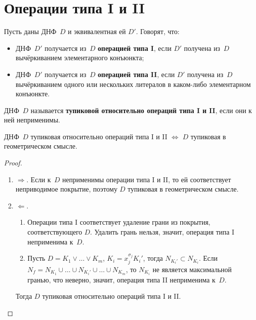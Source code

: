 \section{Операции типа I и II}
Пусть даны ДНФ~$D$ и эквивалентная ей $D'$.
Говорят, что:
\begin{itemize}
	\item ДНФ~$D'$ получается из~$D$ \textbf{операцией типа I}, если $D'$ получена из~$D$ вычёркиванием элементарного конъюнкта;
	\item ДНФ~$D'$ получается из~$D$ \textbf{операцией типа II}, если $D'$ получена из~$D$ вычёркиванием одного или нескольких литералов в каком-либо элементарном конъюнкте.
\end{itemize}

ДНФ~$D$ называется \textbf{тупиковой относительно операций типа I и II}, если они к ней неприменимы.

\begin{statement}
ДНФ~$D$ тупиковая относительно операций типа I и II $\Leftrightarrow$ $D$ тупиковая в геометрическом смысле.
\end{statement}
\begin{proof}
\begin{enumerate}
	\item $\Rightarrow$. Если к~$D$ неприменимы операции типа I и II, то ей соответствует неприводимое покрытие, поэтому $D$ тупиковая в геометрическом смысле.
	\item $\Leftarrow$.
	\begin{enumerate}
		\item Операции типа I соответствует удаление грани из покрытия, соответствующего $D$.
		Удалить грань нельзя, значит, операция типа I неприменима к~$D$.
		\item Пусть $D = K_1 \lor \ldots \lor K_m$, $K_i = x_j^{\sigma_j} K_i'$, тогда $N_{K_i'} \subset N_{K_i}$.
		Если $N_f = N_{K_1} \cup \ldots \cup N_{K_i'} \cup \ldots \cup N_{K_m}$, то $N_{K_i}$ не является максимальной гранью, что неверно, значит, операция типа II неприменима к~$D$.
	\end{enumerate}
	
	Тогда $D$ тупиковая относительно операций типа I и II.
\end{enumerate}
\end{proof}